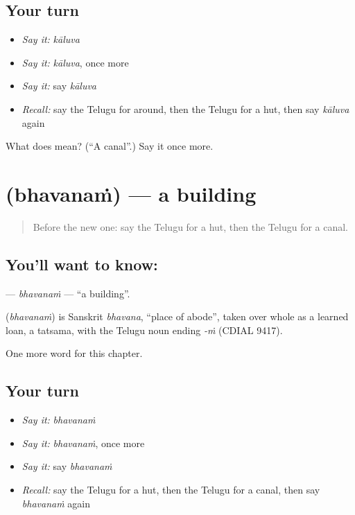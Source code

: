 \subsection*{Your turn}
\begin{itemize}
\raggedright
  \item \emph{Say it:} \emph{kāluva}
  \item \emph{Say it:} \emph{kāluva}, once more
  \item \emph{Say it:} say \emph{kāluva}
  \item \emph{Recall:} say the Telugu for around, then the Telugu for a hut, then say \emph{kāluva} again
\end{itemize}

\begin{tcolorbox}[breakable,colback=teal!4,colframe=teal!35!black,title={Before you move on}]
What does  mean? (\textquotedblleft{}A canal\textquotedblright{}.) Say it once more.
\end{tcolorbox}
\section[\texorpdfstring{\te{భవనం} (bhavanaṁ)}{భవనం (bhavanaṁ)}]{ (bhavanaṁ) — a building}

\label{lesson:TE-C292-bhavanam}



\begin{quote}
Before the new one: say the Telugu for a hut, then the Telugu for a canal.
\end{quote}

\subsection*{You'll want to know: }
\textbf{} — \emph{bhavanaṁ} — \textquotedblleft{}a building\textquotedblright{}.

\begin{cousinweb}
\textbf{} (\emph{bhavanaṁ}) is Sanskrit \emph{bhavana}, \textquotedblleft{}place of abode\textquotedblright{}, taken over whole as a learned loan, a tatsama, with the Telugu noun ending \emph{-ṁ} (CDIAL 9417).
\end{cousinweb}

\begin{grammarlens}[title={What you've built}]
One more word for this chapter.
\end{grammarlens}

\subsection*{Your turn}
\begin{itemize}
\raggedright
  \item \emph{Say it:} \emph{bhavanaṁ}
  \item \emph{Say it:} \emph{bhavanaṁ}, once more
  \item \emph{Say it:} say \emph{bhavanaṁ}
  \item \emph{Recall:} say the Telugu for a hut, then the Telugu for a canal, then say \emph{bhavanaṁ} again
\end{itemize}

